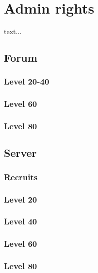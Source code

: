 \chapter{Admin rights}
text...

\section{Forum}

\subsection*{Level 20-40}
\subsection*{Level 60}
\subsection*{Level 80}

\section{Server}

\subsection*{Recruits}
\subsection*{Level 20}
\subsection*{Level 40}
\subsection*{Level 60}
\subsection*{Level 80}